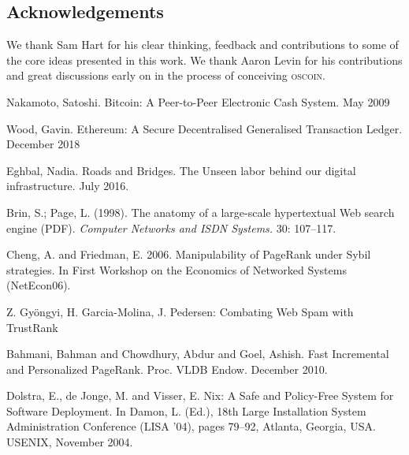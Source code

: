 \documentclass[a4paper, oneside, 10pt, final]{amsart}
\def\oscoin{\textsc{\small{oscoin}}}
\begin{document}
\setlength{\columnsep}{1cm}
\begin{multicols}{2}

\medskip








\section*{Acknowledgements}
We thank Sam Hart for his clear thinking, feedback and contributions to some of
the core ideas presented in this work. We thank Aaron Levin for his contributions
and great discussions early on in the process of conceiving \oscoin{}.

\begin{thebibliography}{9}

 Nakamoto, Satoshi. Bitcoin: A Peer-to-Peer Electronic Cash
  System. May 2009

 Wood, Gavin. Ethereum: A Secure Decentralised Generalised
  Transaction Ledger. December 2018

 Eghbal, Nadia. Roads and Bridges. The Unseen labor
  behind our digital infrastructure. July 2016.

 Brin, S.; Page, L. (1998). The anatomy of a
  large-scale hypertextual Web search engine (PDF). \emph{Computer Networks
  and ISDN Systems.} 30: 107–117.

 Cheng, A. and Friedman, E. 2006. Manipulability of
  PageRank under Sybil strategies. In First Workshop on the Economics of
  Networked Systems (NetEcon06).

 Z. Gyöngyi, H. Garcia-Molina, J. Pedersen: Combating Web
  Spam with TrustRank

 Bahmani, Bahman and Chowdhury, Abdur and Goel,
  Ashish. Fast Incremental and Personalized PageRank. Proc. VLDB
  Endow. December 2010.

 Dolstra, E., de Jonge, M. and Visser, E. Nix: A Safe and
  Policy-Free System for Software Deployment. In Damon, L. (Ed.), 18th Large
  Installation System Administration Conference (LISA '04), pages 79–92, Atlanta,
  Georgia, USA. USENIX, November 2004.

\end{thebibliography}

\end{multicols}
\end{document}
